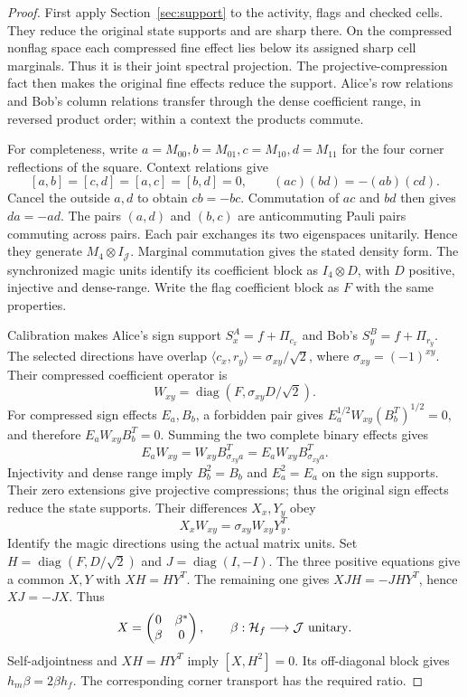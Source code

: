 \begin{proof}
First apply Section~\ref{sec:support} to the activity, flags and checked cells. They reduce the original state supports and are sharp there. On the compressed nonflag space each compressed fine effect lies below its assigned sharp cell marginals. Thus it is their joint spectral projection. The projective-compression fact then makes the original fine effects reduce the support. Alice's row relations and Bob's column relations transfer through the dense coefficient range, in reversed product order; within a context the products commute.

For completeness, write $a=M_{00},b=M_{01},c=M_{10},d=M_{11}$ for the four corner reflections of the square. Context relations give
\[
 [a,b]=[c,d]=[a,c]=[b,d]=0,\qquad
 (ac)(bd)=-(ab)(cd).
\]
Cancel the outside $a,d$ to obtain $cb=-bc$. Commutation of $ac$ and $bd$ then gives $da=-ad$. The pairs $(a,d)$ and $(b,c)$ are anticommuting Pauli pairs commuting across pairs. Each pair exchanges its two eigenspaces unitarily. Hence they generate $M_4\otimes I_{\mathcal J}$. Marginal commutation gives the stated density form. The synchronized magic units identify its coefficient block as $I_4\otimes D$, with $D$ positive, injective and dense-range. Write the flag coefficient block as $F$ with the same properties.

Calibration makes Alice's sign support $S_x^A=f+\Pi_{c_x}$ and Bob's $S_y^B=f+\Pi_{r_y}$. The selected directions have overlap $\langle c_x,r_y\rangle=\sigma_{xy}/\sqrt2$, where $\sigma_{xy}=(-1)^{xy}$. Their compressed coefficient operator is
\[
 W_{xy}=\operatorname{diag}(F,\sigma_{xy}D/\sqrt2).
\]
For compressed sign effects $E_a,B_b$, a forbidden pair gives
$E_a^{1/2}W_{xy}(B_b^T)^{1/2}=0$, and therefore $E_aW_{xy}B_b^T=0$. Summing the two complete binary effects gives
\[
 E_aW_{xy}=W_{xy}B_{\sigma_{xy}a}^T
            =E_aW_{xy}B_{\sigma_{xy}a}^T.
\]
Injectivity and dense range imply $B_b^2=B_b$ and $E_a^2=E_a$ on the sign supports. Their zero extensions give projective compressions; thus the original sign effects reduce the state supports. Their differences $X_x,Y_y$ obey
\begin{equation}\label{eq:sign}
 X_xW_{xy}=\sigma_{xy}W_{xy}Y_y^T.
\end{equation}
Identify the magic directions using the actual matrix units. Set $H=\operatorname{diag}(F,D/\sqrt2)$ and $J=\operatorname{diag}(I,-I)$. The three positive equations give a common $X,Y$ with $XH=HY^T$. The remaining one gives $XJH=-JHY^T$, hence $XJ=-JX$. Thus
\[
 X=\begin{pmatrix}0&\beta^*\\\beta&0\end{pmatrix},\qquad
 \beta:\mathcal H_f\longrightarrow\mathcal J\ \hbox{unitary}.
\]
Self-adjointness and $XH=HY^T$ imply $[X,H^2]=0$. Its off-diagonal block gives $h_m\beta=2\beta h_f$. The corresponding corner transport has the required ratio.


\end{proof}
